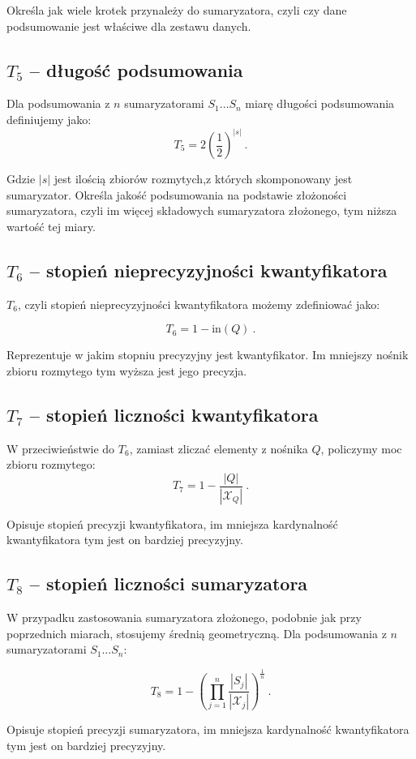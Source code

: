 \documentclass{classrep}
\begin{document}
 Określa jak wiele krotek przynależy do sumaryzatora, czyli czy dane podsumowanie jest właściwe dla zestawu danych.

\subsection{\(T_5\) -- długość podsumowania}
Dla podsumowania z \(n\) sumaryzatorami \(S_1 \ldots S_n\)
miarę długości podsumowania definiujemy jako:
\[T_5 =  2 \left(\frac{1}{2}\right)^{|s|} ~\mbox{.}\]

Gdzie \(|s|\) jest ilością zbiorów rozmytych,z  których skomponowany jest sumaryzator. Określa jakość podsumowania na podstawie złożoności sumaryzatora, czyli im więcej składowych sumaryzatora złożonego, tym niższa wartość tej miary.

\subsection{\(T_6\) -- stopień nieprecyzyjności kwantyfikatora}
\(T_6\), czyli stopień nieprecyzyjności kwantyfikatora możemy zdefiniować jako:

\[T_6 = 1-\mathrm{in}(Q) ~\mbox{.}\]

Reprezentuje w jakim stopniu precyzyjny jest kwantyfikator. Im mniejszy nośnik zbioru rozmytego tym wyższa jest jego precyzja.

\subsection{\(T_7\) -- stopień liczności kwantyfikatora}
W przeciwieństwie do \(T_6\), zamiast zliczać elementy z nośnika \(Q\),
policzymy moc zbioru rozmytego:
\[T_7 = 1-\frac{|Q|}{|\mathcal{X}_Q|} ~\mbox{.}\]

Opisuje stopień precyzji kwantyfikatora, im mniejsza kardynalność kwantyfikatora tym jest on bardziej precyzyjny.

\subsection{\(T_8\) -- stopień liczności sumaryzatora}
W przypadku zastosowania sumaryzatora złożonego, podobnie jak przy poprzednich miarach, stosujemy średnią geometryczną.
Dla podsumowania z \(n\) sumaryzatorami \(S_1 \ldots S_n\):

\[T_8 = 1- \left(\prod_{j=1}^{n} \frac{|S_j|}{|\mathcal{X}_j|}\right)^{\frac{1}{n}} ~\mbox{.}\]

Opisuje stopień precyzji sumaryzatora, im mniejsza kardynalność kwantyfikatora tym jest on bardziej precyzyjny.
\end{document}
